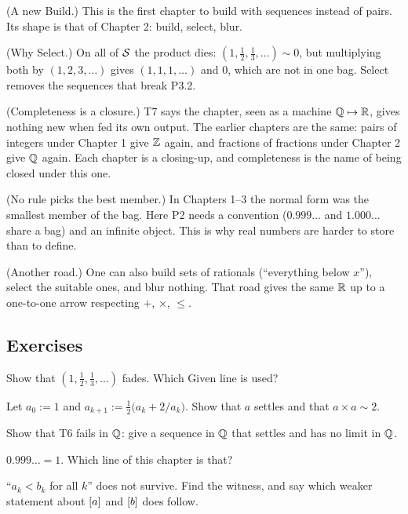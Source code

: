 \begin{lines}
\item[\lab{R1}] (A new Build.) This is the first chapter to build with sequences instead of pairs. Its shape is that of Chapter 2: build, select, blur.
\item[\lab{R2}] (Why Select.) On all of $\mathcal{S}$ the product dies: $(1, \tfrac12, \tfrac13, \dots) \sim 0$, but multiplying both by $(1, 2, 3, \dots)$ gives $(1, 1, 1, \dots)$ and $0$, which are not in one bag. Select removes the sequences that break P3.2.
\item[\lab{R3}] (Completeness is a closure.) T7 says the chapter, seen as a machine $\mathbb{Q} \mapsto \mathbb{R}$, gives nothing new when fed its own output. The earlier chapters are the same: pairs of integers under Chapter 1 give $\mathbb{Z}$ again, and fractions of fractions under Chapter 2 give $\mathbb{Q}$ again. Each chapter is a closing-up, and completeness is the name of being closed under this one.
\item[\lab{R4}] (No rule picks the best member.) In Chapters 1--3 the normal form was the smallest member of the bag. Here P2 needs a convention ($0.999\dots$ and $1.000\dots$ share a bag) and an infinite object. This is why real numbers are harder to store than to define.
\item[\lab{R5}] (Another road.) One can also build sets of rationals (``everything below $x$''), select the suitable ones, and blur nothing. That road gives the same $\mathbb{R}$ up to a one-to-one arrow respecting $+$, $\times$, $\le$.
\end{lines}

\subsection*{Exercises}

\begin{lines}
\item[\lab{E1}] Show that $(1, \tfrac12, \tfrac13, \dots)$ fades. Which Given line is used?
\item[\lab{E2}] Let $a_0 := 1$ and $a_{k+1} := \tfrac12 \bigl(a_k + 2 / a_k\bigr)$. Show that $a$ settles and that $a \times a \sim 2$.
\item[\lab{E3}] Show that T6 fails in $\mathbb{Q}$: give a sequence in $\mathbb{Q}$ that settles and has no limit in $\mathbb{Q}$.
\item[\lab{E4}] $0.999\dots = 1$. Which line of this chapter is that?
\item[\lab{E5}] ``$a_k < b_k$ for all $k$'' does not survive. Find the witness, and say which weaker statement about $[a]$ and $[b]$ does follow.
\end{lines}

